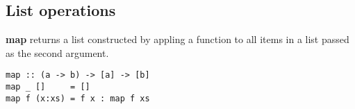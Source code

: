 %

\subsection{List operations}

\textbf{map} returns a list constructed by appling a function to all items in a list passed as the second argument.
\begin{verbatim}
map :: (a -> b) -> [a] -> [b]
map _ []     = []
map f (x:xs) = f x : map f xs
\end{verbatim}












































%
